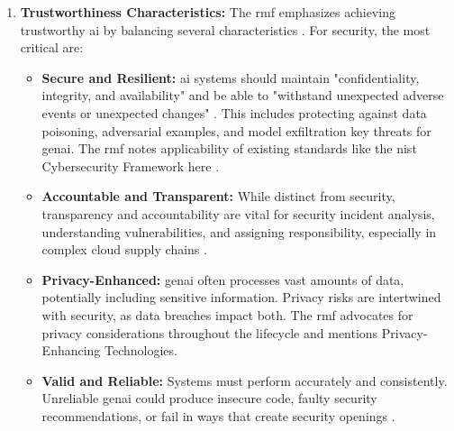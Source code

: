 \begin{enumerate}
\item \textbf{Trustworthiness Characteristics:} The \gls{rmf} emphasizes achieving trustworthy \gls{ai} by balancing several characteristics \cite{tabassi_artificial_2023}. For security, the most critical are:
\begin{itemize}
\item \textbf{Secure and Resilient:} \gls{ai} systems should maintain "confidentiality, integrity, and availability" and be able to "withstand unexpected adverse events or unexpected changes" \cite[p.15]{tabassi_artificial_2023}. This includes protecting against data poisoning, adversarial examples, and model exfiltration key threats for \gls{genai}. The \gls{rmf} notes applicability of existing standards like the \gls{nist} Cybersecurity Framework here \cite[p.15]{tabassi_artificial_2023}.
\item \textbf{Accountable and Transparent:} While distinct from security, transparency and accountability are vital for security incident analysis, understanding vulnerabilities, and assigning responsibility, especially in complex cloud supply chains \cite{tabassi_artificial_2023}.
\item \textbf{Privacy-Enhanced:} \gls{genai} often processes vast amounts of data, potentially including sensitive information. Privacy risks are intertwined with security, as data breaches impact both. The \gls{rmf} advocates for privacy considerations throughout the lifecycle and mentions Privacy-Enhancing Technologies\cite{tabassi_artificial_2023}.
\item \textbf{Valid and Reliable:} Systems must perform accurately and consistently. Unreliable \gls{genai} could produce insecure code, faulty security recommendations, or fail in ways that create security openings \cite{tabassi_artificial_2023}.
\end{itemize}


\end{enumerate}
